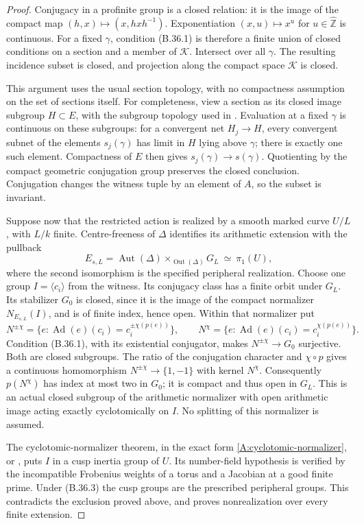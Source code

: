 \documentclass[11pt,oneside]{article}
\begin{document}
\begin{proof}
Conjugacy in a profinite group is a closed relation:
it is the image of the compact map
$(h,x)\mapsto(x,hxh^{-1})$. Exponentiation
$(x,u)\mapsto x^u$ for $u\in\widehat{\mathbb Z}$ is
continuous. For a fixed $\gamma$, condition (B.36.1) is
therefore a finite union of closed conditions on a section
and a member of $\mathcal K$. Intersect over all $\gamma$.
The resulting incidence subset is closed, and projection
along the compact space $\mathcal K$ is closed.

This argument uses the usual section topology, with no
compactness assumption on the set of sections itself.
For completeness, view a section as its closed image
subgroup $H\subset E$, with the subgroup topology used in
\cite[Section 3]{B_CarlsonCorwin}. Evaluation at a fixed
$\gamma$ is continuous on these subgroups: for a convergent
net $H_j\to H$, every convergent subnet of the elements
$s_j(\gamma)$ has limit in $H$ lying above $\gamma$;
there is exactly one such element. Compactness of $E$
then gives $s_j(\gamma)\to s(\gamma)$. Quotienting by
the compact geometric conjugation group preserves the
closed conclusion. Conjugation changes the witness tuple
by an element of $A$, so the subset is invariant.

Suppose now that the restricted action is realized by a
smooth marked curve $U/L$, with $L/k$ finite. Centre-freeness
of $\Delta$ identifies its arithmetic extension with the
pullback
\[
 E_{s,L}=\operatorname{Aut}(\Delta)
       \mathop{\times}_{\operatorname{Out}(\Delta)}G_L
       \ \simeq\ \pi_1(U),
 \tag{B.36.3}
\]
where the second isomorphism is the specified peripheral
realization. Choose one group $I=\langle c_i\rangle$ from
the witness. Its conjugacy class has a finite orbit under
$G_L$. Its stabilizer $G_0$ is closed, since it is the image
of the compact normalizer $N_{E_{s,L}}(I)$, and is of finite
index, hence open. Within that normalizer put
\[
 N^{\pm\chi}=
 \{e:\operatorname{Ad}(e)(c_i)
            =c_i^{\pm\chi(p(e))}\},\qquad
 N^\chi=
 \{e:\operatorname{Ad}(e)(c_i)
            =c_i^{\chi(p(e))}\}.
 \tag{B.36.4}
\]
Condition (B.36.1), with its existential conjugator,
makes $N^{\pm\chi}\to G_0$ surjective. Both are closed
subgroups. The ratio of the conjugation character and
$\chi\circ p$ gives a continuous homomorphism
$N^{\pm\chi}\to\{1,-1\}$ with kernel $N^\chi$.
Consequently $p(N^\chi)$ has index at most two in $G_0$;
it is compact and thus open in $G_L$. This is an actual
closed subgroup of the arithmetic normalizer with open
arithmetic image acting exactly cyclotomically on $I$.
No splitting of this normalizer is assumed.

The cyclotomic-normalizer theorem, in the exact form
\ref{A:cyclotomic-normalizer}, or
\cite[Theorem 20]{B_StixCuspidal}, puts $I$ in a cusp
inertia group of $U$. Its number-field hypothesis is
verified by the incompatible Frobenius weights of a torus
and a Jacobian at a good finite prime. Under (B.36.3)
the cusp groups are the prescribed peripheral groups.
This contradicts the exclusion proved above, and proves
nonrealization over every finite extension.
\end{proof}
\end{document}
